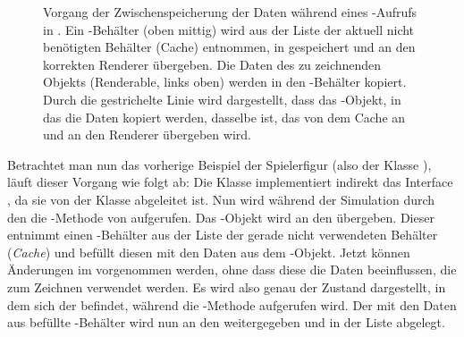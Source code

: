 \begin{figure}
	\centering
		\caption[Vorgang der Zwischenspeicherung der Daten während eines -Aufrufs in \classMasterRenderer{}.]{Vorgang der Zwischenspeicherung der Daten während eines -Aufrufs in \classMasterRenderer{}. Ein \classRenderedRenderable{}-Behälter (oben mittig) wird aus der Liste der aktuell nicht benötigten Behälter (Cache) entnommen, in  gespeichert und an den korrekten Renderer übergeben. Die Daten des zu zeichnenden Objekts (Renderable, links oben) werden in den \classRenderedRenderable{}-Behälter kopiert. Durch die gestrichelte Linie wird dargestellt, dass das \classRenderedRenderable{}-Objekt, in das die Daten kopiert werden, dasselbe ist, das von dem Cache an  und an den Renderer übergeben wird.}\label{fig:copyRenderable}
\end{figure}


\begin{example}
	Betrachtet man nun das vorherige Beispiel der Spielerfigur (also der Klasse \classPlayer{}), läuft dieser Vorgang wie folgt ab: Die Klasse \classPlayer{} implementiert indirekt das Interface \classRenderable{}, da sie von der Klasse \classEntity{} abgeleitet ist. Nun wird während der Simulation durch den \classEntityManager{} die -Methode von \classPlayer{} aufgerufen. Das \classPlayer{}-Objekt wird an den \classMasterRenderer{} übergeben. Dieser entnimmt einen \classRenderedRenderable{}-Behälter aus der Liste der gerade nicht verwendeten Behälter (\emph{Cache}) und befüllt diesen mit den Daten aus dem \classPlayer{}-Objekt. Jetzt können Änderungen im \classPlayer{} vorgenommen werden, ohne dass diese die Daten beeinflussen, die zum Zeichnen verwendet werden. Es wird also genau der Zustand dargestellt, in dem sich der \classPlayer{} befindet, während die -Methode aufgerufen wird. Der mit den Daten aus \classPlayer{} befüllte \classRenderedRenderable{}-Behälter wird nun an den \classOpaqueMasterRenderer{} weitergegeben und in der Liste  abgelegt.
\end{example}

